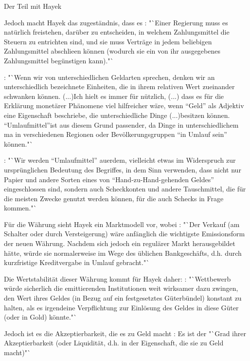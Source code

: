 \documentclass[
    onecolumn,
    a4paper,
    abstracton,
    parskip=half
    ,final
    ]{scrartcl}
\begin{document}
 Der Teil mit Hayek

Jedoch macht Hayek das zugest{\"a}ndnis, dass es \citep[vgl.][S.23]{Hayek1977}: "`Einer Regierung muss es nat{\"u}rlich freistehen, dar{\"u}ber zu entscheiden, in welchem Zahlungsmittel die Steuern zu entrichten sind, und sie muss Vertr{\"a}ge in jedem beliebigen Zahlungsmittel abschlie{\s}en k{\"o}nnen (wodurch sie ein von ihr ausgegebenes Zahlungsmittel beg{\"u}nstigen kann)."`



\citep[vgl.][S.40f]{Hayek1977}: "`Wenn wir von unterschiedlichen Geldarten sprechen, denken wir an unterschiedlich bezeichnete Einheiten, die in ihrem relativen Wert zueinander schwanken k{\"o}nnen. (...)Ich hielt es immer f{\"u}r n{\"u}tzlich, (...) dass es f{\"u}r die Erkl{\"a}rung monet{\"a}rer Ph{\"a}nomene viel hilfreicher w{\"a}re, wenn "`Geld"' als Adjektiv eine Eigenschaft beschriebe, die unterschiedliche Dinge (...)besitzen k{\"o}nnen. "`Umlaufmittel"'ist aus diesem Grund passender, da Dinge in unterschiedlichem ma{\s} in verschiedenen Regionen oder Bev{\"o}lkerungsgruppen "`in Umlauf sein"' k{\"o}nnen."`

\citep[vgl.][S.43]{Hayek1977}: "`Wir werden "`Umlaufmittel"' au{\s}erdem, vielleicht etwas im Widerspruch zur urspr{\"u}nglichen Bedeutung des Begriffes, in dem Sinn verwenden, dass nicht nur Papier und andere Sorten eines von "`Hand-zu-Hand-gehenden Geldes"' eingeschlossen sind, sondern auch Scheckkonten und andere Tauschmittel, die f{\"u}r die meisten Zwecke genutzt werden k{\"o}nnen, f{\"u}r die auch Schecks in Frage kommen."`

F{\"u}r die W{\"a}hrung sieht Hayek ein Marktmodell vor, wobei \citep[vgl.][S.31]{Hayek1977}: "`Der Verkauf (am Schalter oder durch Versteigerung) w{\"a}re anf{\"a}nglich die wichtigste Emissionsform der neuen W{\"a}hrung. Nachdem sich jedoch ein regul{\"a}rer Markt herausgebildet h{\"a}tte, w{\"u}rde sie normalerweise im Wege des {\"u}blichen Bankgesch{\"a}fts, d.h. durch kurzfristige Kreditvergabe in Umlauf gebracht."`

Die Wertstabilit{\"a}t dieser W{\"a}hrung kommt f{\"u}r Hayek daher: \citep[vgl.][S.32]{Hayek1977}: "`Wettbewerb w{\"u}rde sicherlich die emittierenden Institutionen weit wirksamer dazu zwingen, den Wert ihres Geldes (in Bezug auf ein festgesetztes G{\"u}terb{\"u}ndel) konstant zu halten, als es irgendeine Verpflichtung zur Einl{\"o}sung des Geldes in diese G{\"u}ter (oder in Gold) k{\"o}nnte."`

Jedoch ist es die Akzeptierbarkeit, die es zu Geld macht \citep[vgl.][S.40]{Hayek1977}: Es ist der "`Grad ihrer Akzeptierbarkeit (oder Liquidit{\"a}t, d.h. in der Eigenschaft, die sie zu Geld macht)"`
\end{document}
